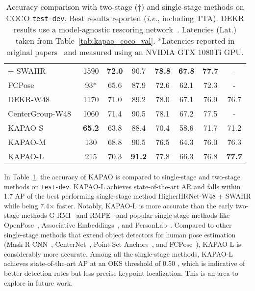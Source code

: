 \documentclass[runningheads]{llncs}
\newcommand{\ie}{\textit{i.e.}}
\newcommand\hll[1]{\bgroup
  \hskip0pt\color{black}#1\egroup
}
\newcommand\hlll[1]{\bgroup
  \hskip0pt\color{black}#1\egroup
}
\begin{document}
\begin{table}[t!]
\begin{tabular}{l|c|c|c|c|c|c|c}
	\hll{\quad + SWAHR~\cite{luo2021rethinking}} & 1590 & \textbf{72.0} & 90.7 & \textbf{78.8} & \textbf{67.8} & \textbf{77.7} & - \\
	\hll{FCPose~\cite{mao2021fcpose}} & 93* & 65.6 & 87.9 & 72.6 & 62.1 & 72.3 & - \\
	DEKR-W48~\cite{geng2021bottom} & 1170 & 71.0 & 89.2 & 78.0 & 67.1 & 76.9 & 76.7\\
	\hll{CenterGroup-W48~\cite{braso2021center}} & 1060 & 71.4 & 90.5 & 78.1 & 67.2 & 77.5 & - \\
	KAPAO-S & \textbf{65.2} & 63.8 & 88.4 & 70.4 & 58.6 & 71.7 & 71.2 \\
	KAPAO-M & 130 & 68.8 & 90.5 & 76.5 & 64.3 & 76.0 & 76.3 \\
	KAPAO-L & 215 & 70.3 & \textbf{91.2} & 77.8 & 66.3 & 76.8 & \textbf{77.7} \\
	\hline
\end{tabular}
\smallskip
\caption[KAPAO compared to state-of-the-art two-stage and single-stage methods on COCO \texttt{test-dev}.]{Accuracy comparison with two-stage ($\dagger$) and single-stage methods on COCO \texttt{test-dev}. Best results \hlll{reported} (\ie, including TTA). DEKR results use a model-agnostic rescoring network~\cite{geng2021bottom}. \hll{Latencies (Lat.) taken from Table~\ref{tab:kapao_coco_val}. *Latencies reported in original papers~\cite{cao2018openpose, mao2021fcpose} and measured using an NVIDIA GTX 1080Ti GPU.}}
\label{tab:kapao_coco_test}
\end{table}

In Table~\ref{tab:kapao_coco_test}, the accuracy of KAPAO is compared to single-stage and two-stage methods on \texttt{test-dev}. KAPAO-L achieves state-of-the-art AR and falls within \hll{1.7 AP of \hlll{the} best performing single-stage method HigherHRNet-W48 + SWAHR while being 7.4$\times$ faster. Notably, KAPAO-L is more accurate than the early two-stage methods G-RMI~\cite{papandreou2017towards} and RMPE~\cite{fang2017rmpe} and \hlll{popular} single-stage methods like OpenPose~\cite{cao2017realtime, cao2018openpose}, Associative Embeddings~\cite{newell2017associative}, and PersonLab~\cite{papandreou2018personlab}. Compared to other single-stage methods that extend object detectors for human pose estimation (Mask R-CNN~\cite{he2017mask}, CenterNet~\cite{zhou2019objects}, Point-Set Anchors~\cite{wei2020point}, and FCPose~\cite{mao2021fcpose}), KAPAO-L is considerably more accurate. Among all the single-stage methods, KAPAO-L achieves state-of-the-art AP at an OKS threshold of 0.50}, which is indicative of better detection rates but less precise keypoint localization. This is an area to explore in future work.
\end{document}
